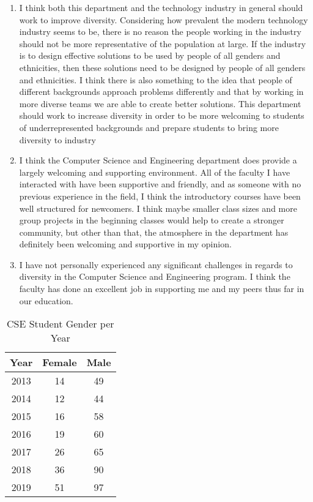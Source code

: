 \documentclass[letterpaper]{article}
\begin{document}
\begin{enumerate}

\item{I think both this department and the technology industry in general should work to improve diversity.  Considering how prevalent the modern technology industry seems to be, there is no reason the people working in the industry should not be more representative of the population at large.  If the industry is to design effective solutions to be used by people of all genders and ethnicities, then these solutions need to be designed by people of all genders and ethnicities.  I think there is also something to the idea that people of different backgrounds approach problems differently and that by working in more diverse teams we are able to create better solutions.  This department should work to increase diversity in order to be more welcoming to students of underrepresented backgrounds and prepare students to bring more diversity to industry}

\item{I think the Computer Science and Engineering department does provide a largely welcoming and supporting environment.  All of the faculty I have interacted with have been supportive and friendly, and as someone with no previous experience in the field, I think the introductory courses have been well structured for newcomers.  I think maybe smaller class sizes and more group projects in the beginning classes would help to create a stronger community, but other than that, the atmosphere in the department has definitely been welcoming and supportive in my opinion.}

\item{I have not personally experienced any significant challenges in regards to diversity in the Computer Science and Engineering program.  I think the faculty has done an excellent job in supporting me and my peers thus far in our education.}

\end{enumerate}

\begin{table}[h]
    \centering
        \begin{tabular}{|c|c|c|}
            Year & Female & Male\\
            \hline
            2013 & 14 & 49\\
            2014 & 12 & 44\\
            2015 & 16 & 58\\
            2016 & 19 & 60\\
            2017 & 26 & 65\\
            2018 & 36 & 90\\
            2019 & 51 & 97\\
        \end{tabular}
    \caption{CSE Student Gender per Year}
    \label{tbl:gender}
\end{table}
\end{document}
